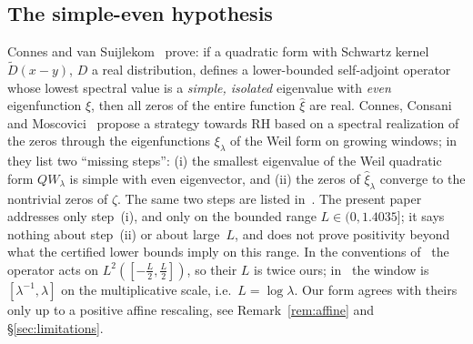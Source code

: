 \documentclass[11pt]{amsart}
\newcommand{\Lmax}{1.4035}                                %
\theoremstyle{definition}
\theoremstyle{remark}
\numberwithin{equation}{section}
\begin{document}
\subsection{The simple-even hypothesis}
Connes and van Suijlekom~\cite[Thm.~6.1]{CvS} prove: if a quadratic form with Schwartz kernel $\tilde D(x-y)$, $D$ a real distribution, defines a lower-bounded self-adjoint operator whose lowest spectral value is a \emph{simple, isolated} eigenvalue with \emph{even} eigenfunction $\xi$, then all zeros of the entire function $\hat\xi$ are real. Connes, Consani and Moscovici~\cite{CCM25} propose a strategy towards RH based on a spectral realization of the zeros through the eigenfunctions $\xi_\lambda$ of the Weil form on growing windows; in \cite[\S8]{CCM25} they list two ``missing steps'': (i) the smallest eigenvalue of the Weil quadratic form $QW_\lambda$ is simple with even eigenvector, and (ii) the zeros of $\hat\xi_\lambda$ converge to the nontrivial zeros of $\zeta$. The same two steps are listed in~\cite[\S6.6]{Connes26}. The present paper addresses only step~(i), and only on the bounded range $L\in(0,\Lmax]$; it says nothing about step~(ii) or about large~$L$, and does not prove positivity beyond what the certified lower bounds imply on this range. In the conventions of~\cite{CvS} the operator acts on $L^2([-\tfrac L2,\tfrac L2])$, so their $L$ is twice ours; in~\cite{CCM25} the window is $[\lambda^{-1},\lambda]$ on the multiplicative scale, i.e.\ $L=\log\lambda$. Our form agrees with theirs only up to a positive affine rescaling, see Remark~\ref{rem:affine} and \S\ref{sec:limitations}.
\end{document}
